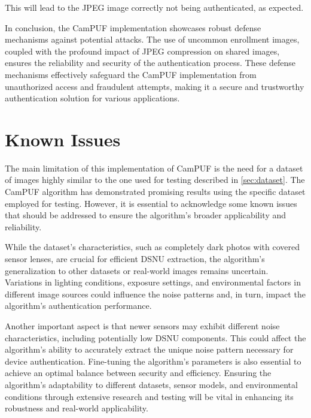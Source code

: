 This will lead to the JPEG image correctly not being authenticated, as expected.

In conclusion, the CamPUF implementation showcases robust defense mechanisms against potential attacks. The use of uncommon enrollment images, coupled with the profound impact of JPEG compression on shared images, ensures the reliability and security of the authentication process. These defense mechanisms effectively safeguard the CamPUF implementation from unauthorized access and fraudulent attempts, making it a secure and trustworthy authentication solution for various applications.

\section{Known Issues}
The main limitation of this implementation of CamPUF is the need for a dataset of images highly similar to the one used for testing described in \ref{sec:dataset}. The CamPUF algorithm has demonstrated promising results using the specific dataset employed for testing. However, it is essential to acknowledge some known issues that should be addressed to ensure the algorithm's broader applicability and reliability.

While the dataset's characteristics, such as completely dark photos with covered sensor lenses, are crucial for efficient DSNU extraction, the algorithm's generalization to other datasets or real-world images remains uncertain. Variations in lighting conditions, exposure settings, and environmental factors in different image sources could influence the noise patterns and, in turn, impact the algorithm's authentication performance. 

Another important aspect is that newer sensors may exhibit different noise characteristics, including potentially low DSNU components. This could affect the algorithm's ability to accurately extract the unique noise pattern necessary for device authentication. Fine-tuning the algorithm's parameters is also essential to achieve an optimal balance between security and efficiency. Ensuring the algorithm's adaptability to different datasets, sensor models, and environmental conditions through extensive research and testing will be vital in enhancing its robustness and real-world applicability.



